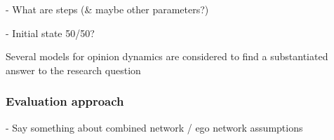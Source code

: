 - What are steps (\& maybe other parameters?)

- Initial state 50/50?

Several models for opinion dynamics are considered to find a substantiated answer to the research question 


\subsubsection{Evaluation approach\nopunct}\hfill \break
- Say something about combined network / ego network assumptions




















% 
